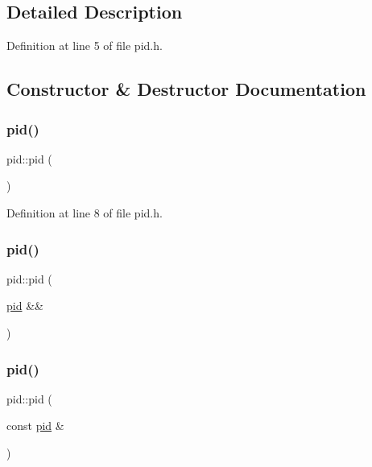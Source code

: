 \subsection{Detailed Description}


Definition at line 5 of file pid.\+h.



\subsection{Constructor \& Destructor Documentation}
\mbox{\label{classpid_a8cb9ff8fa0e7162d275990d01fb1588d}} 
\subsubsection{\texorpdfstring{pid()}{pid()}\hspace{0.1cm}{\footnotesize\ttfamily [1/3]}}
{\footnotesize\ttfamily pid\+::pid (\begin{DoxyParamCaption}{ }\end{DoxyParamCaption})\hspace{0.3cm}{\ttfamily [inline]}}



Definition at line 8 of file pid.\+h.

\mbox{\label{classpid_a6f1ee24f4f71509c5deb1c0ad0055570}} 
\subsubsection{\texorpdfstring{pid()}{pid()}\hspace{0.1cm}{\footnotesize\ttfamily [2/3]}}
{\footnotesize\ttfamily pid\+::pid (\begin{DoxyParamCaption}\item[{\mbox{\hyperlink{classpid}{pid}} \&\&}]{ }\end{DoxyParamCaption})\hspace{0.3cm}{\ttfamily [default]}}

\mbox{\label{classpid_a9575073392a8eacc4e22035f5150b5ea}} 
\subsubsection{\texorpdfstring{pid()}{pid()}\hspace{0.1cm}{\footnotesize\ttfamily [3/3]}}
{\footnotesize\ttfamily pid\+::pid (\begin{DoxyParamCaption}\item[{const \mbox{\hyperlink{classpid}{pid}} \&}]{ }\end{DoxyParamCaption})\hspace{0.3cm}{\ttfamily [default]}}


